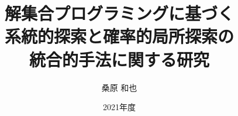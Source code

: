 \documentclass[a4paper,12pt,dvipdfmx]{jbook}
\institute{名古屋大学大学院情報学研究科}
\title{解集合プログラミングに基づく\\
系統的探索と確率的局所探索の\\
統合的手法に関する研究}
\date{2021年度}
\author{桑原 和也}
\begin{document}
\maketitle


\tableofcontents    %
\listoffigures      %
\listoftables       %
\lstlistoflistings  %










\end{document}
